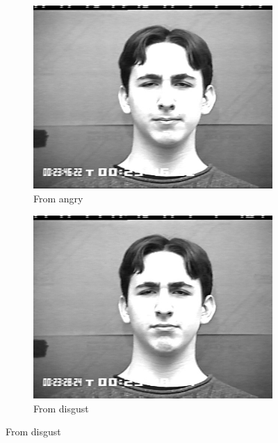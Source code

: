 \begin{figure}%
	\centering
	\begin{subfigure}[b]{0.2\textwidth}
		\includegraphics[width=\textwidth]{./img/indistinguishable/angry.png}
		\caption{From angry}
		\label{fig:indistinguishable:angry}
	\end{subfigure}
	\begin{subfigure}[b]{0.2\textwidth}
		\includegraphics[width=\textwidth]{./img/indistinguishable/disgust.png}
		\caption{From disgust}
		\label{fig:indistinguishable:disgust}
	\end{subfigure}

\end{figure}

